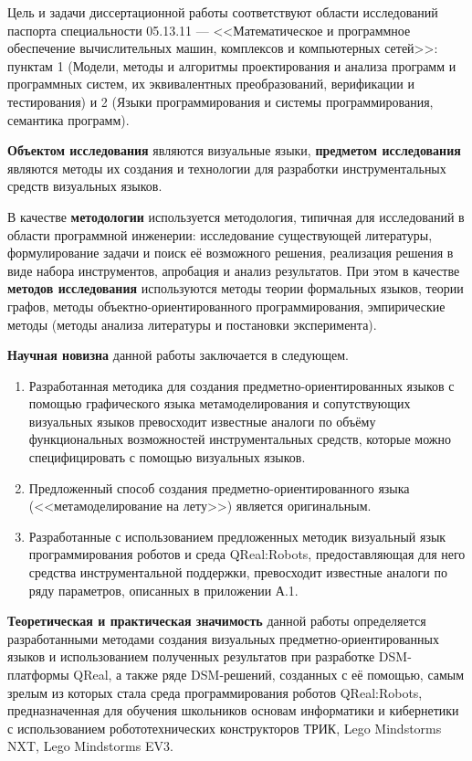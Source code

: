 Цель и задачи диссертационной работы соответствуют области исследований паспорта специальности 
05.13.11 --- <<Математическое и программное обеспечение вычислительных машин, комплексов и компьютерных сетей>>: 
пунктам 1 (Модели, методы и алгоритмы проектирования и анализа программ и программных 
систем, их эквивалентных преобразований, верификации и тестирования) и 2 (Языки программирования 
и системы программирования, семантика программ).

\textbf{Объектом исследования} являются визуальные языки, \textbf{предметом исследования} 
являются методы их создания и технологии для разработки инструментальных средств визуальных языков.

В качестве \textbf{методологии} используется методология, типичная для исследований в 
области программной инженерии: исследование существующей литературы, формулирование задачи 
и поиск её возможного решения, реализация решения в виде набора инструментов, апробация 
и анализ результатов. При этом в качестве \textbf{методов исследования} используются 
методы теории формальных языков, теории графов, методы объектно-ориентированного программирования, 
эмпирические методы (методы анализа литературы и постановки эксперимента).

\textbf{Научная новизна} данной работы заключается в следующем.
\begin{enumerate}
	\item Разработанная методика для создания предметно-ориентированных языков с помощью 
		графического языка метамоделирования и сопутствующих визуальных языков превосходит 
		известные аналоги по объёму функциональных возможностей инструментальных средств, 
		которые можно специфицировать с помощью визуальных языков.
	\item Предложенный способ создания предметно-ориентированного языка (<<метамоделирование на лету>>)
	является оригинальным. 
	\item Разработанные с использованием предложенных методик визуальный язык программирования роботов 
		и среда QReal:Robots, предоставляющая для него средства инструментальной поддержки, 
		превосходит известные аналоги по ряду параметров, описанных в приложении А.1.
\end{enumerate}

\textbf{Теоретическая и практическая значимость} данной работы определяется разработанными 
методами создания визуальных предметно-ориентированных языков и использованием полученных 
результатов при разработке DSM-платформы QReal, а также ряде DSM-решений, созданных с её помощью, 
самым зрелым из которых стала среда программирования роботов QReal:Robots, 
предназначенная для обучения школьников основам информатики и кибернетики с использованием робототехнических 
конструкторов ТРИК, Lego Mindstorms NXT, Lego Mindstorms EV3.

